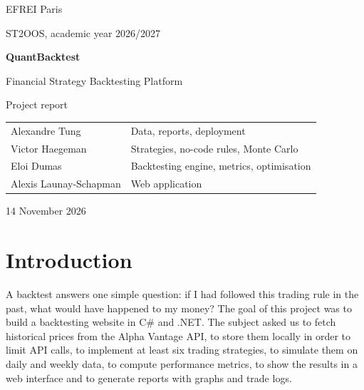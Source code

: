 \documentclass[11pt,a4paper]{article}
\begin{document}
\begin{titlepage}
\centering
\vspace*{2.5cm}
{\large EFREI Paris \par}
{\large ST2OOS, academic year 2026/2027 \par}
\vspace{3cm}
{\Huge\bfseries QuantBacktest \par}
\vspace{0.5cm}
{\LARGE Financial Strategy Backtesting Platform \par}
\vspace{0.5cm}
{\large Project report \par}
\vspace{3cm}
{\large
\begin{tabular}{ll}
Alexandre Tung & Data, reports, deployment \\
Victor Haegeman & Strategies, no-code rules, Monte Carlo \\
Eloi Dumas & Backtesting engine, metrics, optimisation \\
Alexis Launay-Schapman & Web application \\
\end{tabular}
\par}
\vfill
{\normalsize 14 November 2026 \par}
\end{titlepage}

\tableofcontents
\clearpage

\section{Introduction}

A backtest answers one simple question: if I had followed this trading rule in the past, what would have happened to my money? The goal of this project was to build a backtesting website in C\# and .NET. The subject asked us to fetch historical prices from the Alpha Vantage API, to store them locally in order to limit API calls, to implement at least six trading strategies, to simulate them on daily and weekly data, to compute performance metrics, to show the results in a web interface and to generate reports with graphs and trade logs.
\end{document}
